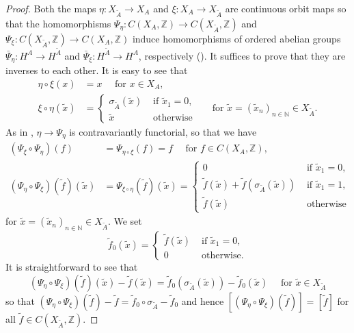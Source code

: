 \documentclass[11pt]{article}
\theoremstyle{plain}
\theoremstyle{definition}
\numberwithin{equation}{section}
\newcommand{\N}{\mathbb{N}}
\newcommand{\Z}{\mathbb{Z}}
\newcommand{\f}{\tilde{f}}
\begin{document}
\begin{proof}
Both the maps 
$\eta:X_{\tilde{A}} \rightarrow X_A$
and
$\xi:X_A \rightarrow X_{\tilde{A}}$
are continuous orbit maps
so that the homomorphisms
$\Psi_\eta: C(X_A,\Z) \rightarrow C(X_{\tilde{A}},\Z)$
and
$\Psi_\xi: C(X_{\tilde{A}},\Z) \rightarrow C(X_A,\Z)$
induce homomorphisms of ordered abelian groups 
$\bar{\Psi}_\eta: H^A \rightarrow H^{\tilde{A}}$
and
$\bar{\Psi}_\xi: H^{\tilde{A}} \rightarrow H^A$,
respectively (\cite{MaPre2014}).
It suffices to prove that they are inverses to each other.
It is easy to see that
\begin{align*}
\eta \circ \xi (x) 
&= x \quad \text{ for } x \in X_A, \\
\xi \circ \eta(\tilde{x})
& = 
{
\begin{cases}
\sigma_{\tilde{A}}(\tilde{x}) & \text{ if } \tilde{x}_1 =0, \\
\tilde{x} & \text{ otherwise }
\end{cases}
}
\quad
\text{ for }
\tilde{x} = (\tilde{x}_n)_{n \in \N} \in X_{\tilde{A}}.
\end{align*}
As in \cite[Proposition 3.4]{MaPre2014},
$\eta \rightarrow \Psi_\eta$ is contravariantly functorial,
so that we have   
\begin{align*}
(\Psi_\xi \circ \Psi_\eta) (f) 
&= \Psi_{\eta \circ \xi} (f) = f 
 \quad \text{ for } f \in C(X_A,\Z), \\
(\Psi_\eta \circ \Psi_\xi )(\f) (\tilde{x})
& =\Psi_{\xi \circ \eta}(\f)(\tilde{x})
 = 
{
\begin{cases}
0 & \text{ if } \tilde{x}_1 =0, \\
\f(\tilde{x}) + \f(\sigma_{\tilde{A}}(\tilde{x}))
 & \text{ if } \tilde{x}_1 =1, \\
\f(\tilde{x}) &  \text{ otherwise }
\end{cases}
}
\end{align*}
for 
$\tilde{x} = (\tilde{x}_n)_{n \in \N} \in X_{\tilde{A}}$.
We set
\begin{equation*}
\f_0(\tilde{x}) =
\begin{cases}
\f(\tilde{x}) & \text{ if } \tilde{x}_1 =0, \\
0  & \text{ otherwise.}
\end{cases}
\end{equation*}
It is straightforward to see that
$$
(\Psi_\eta \circ \Psi_\xi )(\f) (\tilde{x}) -\f(\tilde{x})
= \f_0(\sigma_{\tilde{A}}(\tilde{x})) - \f_0(\tilde{x})
\quad 
\text{ for  }
\tilde{x} \in X_{\tilde{A}}
$$
so that
$
(\Psi_\eta \circ \Psi_\xi )(\f) -\f
= \f_0\circ\sigma_{\tilde{A}} - \f_0
$
and hence
$
[(\Psi_\eta \circ \Psi_\xi )(\f)]
= [\f]
$
for all $\f \in C(X_{\tilde{A}},\Z)$.
\end{proof}
\end{document}
